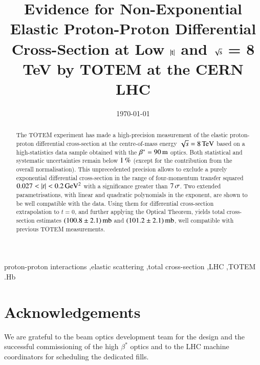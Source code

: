 \documentclass[3p,twocolumn]{elsarticle}
\def\un#1{\,{\rm #1}}
\begin{document}
\begin{frontmatter}

\title{Evidence for Non-Exponential Elastic Proton-Proton Differential Cross-Section at Low $|\hbox{t}|$ and $\sqrt{\hbox{s}}$ = 8 TeV by TOTEM at the CERN LHC}



\date{\today}


\begin{abstract}
The TOTEM experiment has made a high-precision measurement of the elastic 
proton-proton differential cross-section at the centre-of-mass energy 
$\sqrt s = 8\un{TeV}$ based on a high-statistics data sample obtained with 
the $\beta^* = 90\un{m}$ optics. 
Both statistical and systematic uncertainties remain below $1\un{\%}$ (except for the contribution from the overall normalisation). This unprecedented precision allows to exclude a purely exponential differential cross-section in the range of four-momentum transfer squared $0.027 < |t| < 0.2\un{GeV^2}$ with a significance greater than $7\un{\sigma}$.
%
Two extended parametrisations, with linear and quadratic polynomials in the exponent, are shown to be well compatible with the data. Using them for differential cross-section extrapolation to $t=0$, and further applying the Optical Theorem, yields total cross-section estimates $(100.8 \pm 2.1)\un{mb}$ and $(101.2 \pm 2.1)\un{mb}$, well compatible with previous TOTEM measurements.
\end{abstract}

\begin{keyword}
proton-proton interactions \sep elastic scattering \sep total cross-section \sep LHC \sep TOTEM
.Hb %
\end{keyword}
\end{frontmatter}















\section*{Acknowledgements}
We are grateful to the beam optics development team for the design and the 
successful commissioning of the high $\beta^{*}$ optics and to the LHC machine 
coordinators for scheduling the dedicated fills.
\end{document}
